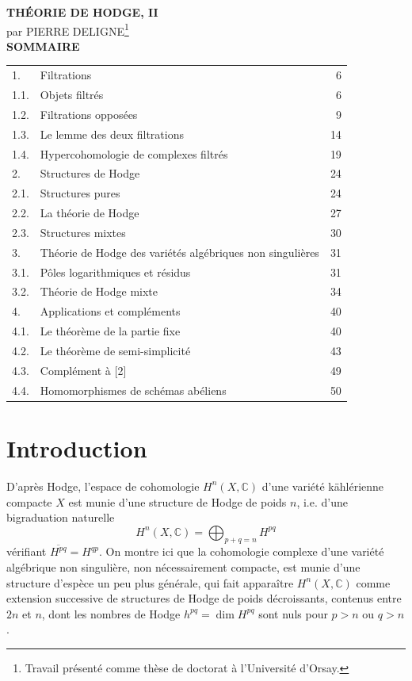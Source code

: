 \documentclass[10pt]{article}
\newcommand{\C}{\mathbb C}
\newcommand{\fg}{\guillemotright}
\newcommand{\og}{\guillemotleft}
\begin{document}
\begin{center}
{\Large\bfseries THÉORIE DE HODGE, II}\\[0.4em]
{\normalsize par PIERRE DELIGNE\footnote{Travail présenté comme thèse de doctorat à l'Université d'Orsay.}}\\[1.3em]
{\bfseries SOMMAIRE}
\end{center}

\begin{center}
\begin{tabular}{llr}
1. & Filtrations & 6\\
1.1. & Objets filtrés & 6\\
1.2. & Filtrations opposées & 9\\
1.3. & Le lemme des deux filtrations & 14\\
1.4. & Hypercohomologie de complexes filtrés & 19\\
2. & Structures de Hodge & 24\\
2.1. & Structures pures & 24\\
2.2. & La théorie de Hodge & 27\\
2.3. & Structures mixtes & 30\\
3. & Théorie de Hodge des variétés algébriques non singulières & 31\\
3.1. & Pôles logarithmiques et résidus & 31\\
3.2. & Théorie de Hodge mixte & 34\\
4. & Applications et compléments & 40\\
4.1. & Le théorème de la partie fixe & 40\\
4.2. & Le théorème de semi-simplicité & 43\\
4.3. & Complément à [2] & 49\\
4.4. & Homomorphismes de schémas abéliens & 50
\end{tabular}
\end{center}

\section*{Introduction}

D'après Hodge, l'espace de cohomologie $H^n(X,\C)$ d'une variété kählérienne compacte $X$ est munie d'une \og structure de Hodge\fg{} de poids $n$, i.e. d'une bigraduation naturelle
\[
H^n(X,\C)=\bigoplus_{p+q=n}H^{pq}
\]
vérifiant $\overline{H^{pq}}=H^{qp}$. On montre ici que la cohomologie complexe d'une variété algébrique non singulière, non nécessairement compacte, est munie d'une structure d'espèce un peu plus générale, qui fait apparaître $H^n(X,\C)$ comme \og extension successive\fg{} de structures de Hodge de poids décroissants, contenus entre $2n$ et $n$, dont les nombres de Hodge $h^{pq}=\dim H^{pq}$ sont nuls pour $p>n$ ou $q>n$.
\end{document}
